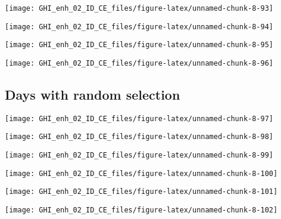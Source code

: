 \documentclass[
  10pt,
  a4paper,oneside]{article}
\begin{document}
\begin{center}\texttt{[image: GHI\_enh\_02\_ID\_CE\_files/figure-latex/unnamed-chunk-8-93]} \end{center}

\begin{center}\texttt{[image: GHI\_enh\_02\_ID\_CE\_files/figure-latex/unnamed-chunk-8-94]} \end{center}

\begin{center}\texttt{[image: GHI\_enh\_02\_ID\_CE\_files/figure-latex/unnamed-chunk-8-95]} \end{center}

\begin{center}\texttt{[image: GHI\_enh\_02\_ID\_CE\_files/figure-latex/unnamed-chunk-8-96]} \end{center}

\FloatBarrier

\hypertarget{days-with-random-selection}{%
\subsection{Days with random selection}\label{days-with-random-selection}}

\begin{center}\texttt{[image: GHI\_enh\_02\_ID\_CE\_files/figure-latex/unnamed-chunk-8-97]} \end{center}

\begin{center}\texttt{[image: GHI\_enh\_02\_ID\_CE\_files/figure-latex/unnamed-chunk-8-98]} \end{center}

\begin{center}\texttt{[image: GHI\_enh\_02\_ID\_CE\_files/figure-latex/unnamed-chunk-8-99]} \end{center}

\begin{center}\texttt{[image: GHI\_enh\_02\_ID\_CE\_files/figure-latex/unnamed-chunk-8-100]} \end{center}

\begin{center}\texttt{[image: GHI\_enh\_02\_ID\_CE\_files/figure-latex/unnamed-chunk-8-101]} \end{center}

\begin{center}\texttt{[image: GHI\_enh\_02\_ID\_CE\_files/figure-latex/unnamed-chunk-8-102]} \end{center}
\end{document}
